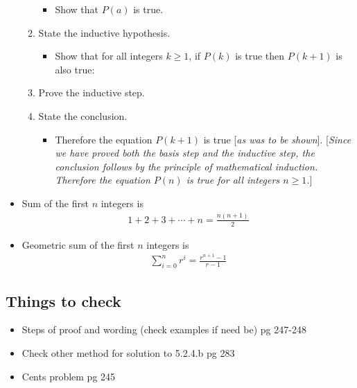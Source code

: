 \documentclass{article}
\begin{document}
\begin{itemize}
\begin{enumerate}
\begin{itemize}
                            \item Show that $P(a)$ is true.
                        \end{itemize}
                    \item State the inductive hypothesis.
                        \begin{itemize}
                            \item Show that for all integers $k \geq 1$, if $P(k)$ is true then $P(k+1)$ is also true:
                        \end{itemize}
                    \item Prove the inductive step.
                    \item State the conclusion.
                        \begin{itemize}
                            \item Therefore the equation $P(k+1)$ is true [\textit{as was to be shown}]. [\textit{Since we have proved both the basis step and the inductive step, the conclusion follows by the principle of mathematical induction. Therefore the equation $P(n)$ is true for all integers $n \geq 1$.}]
                        \end{itemize}
                \end{enumerate}
            \item Sum of the first $n$ integers is
                \begin{align*}
                    1 + 2 + 3 + \cdots + n = \frac{n(n+1)}{2}
                \end{align*}
            \item Geometric sum of the first $n$ integers is
                \begin{align*}
                    \sum_{i=0}^{n} r^i = \frac{r^{n+1}-1}{r-1}
                \end{align*}
        \end{itemize}
    \subsection{Things to check}
        \begin{itemize}
            \item Steps of proof and wording (check examples if need be) pg 247-248
            \item Check other method for solution to 5.2.4.b pg 283
            \item Cents problem pg 245
        \end{itemize}
\end{document}
